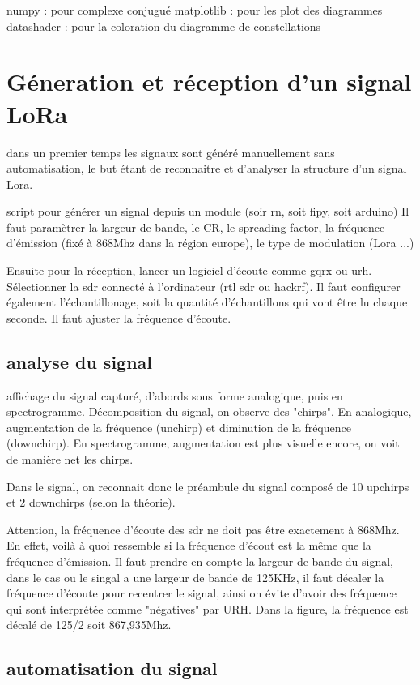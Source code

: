 numpy : pour complexe conjugué
matplotlib : pour les plot des diagrammes
datashader : pour la coloration du diagramme de constellations


\section{Géneration et réception d'un signal LoRa}

dans un premier temps les signaux sont généré manuellement sans automatisation, le but étant de reconnaitre et d'analyser la structure d'un signal Lora.

script pour générer un signal depuis un module (soir rn, soit fipy, soit arduino)
Il faut paramètrer la largeur de bande, le CR, le spreading factor, la fréquence d'émission (fixé à 868Mhz dans la région europe), le type de modulation (Lora ...)

Ensuite pour la réception, lancer un logiciel d'écoute comme gqrx ou urh. Sélectionner la sdr connecté à l'ordinateur (rtl sdr ou hackrf). Il faut configurer également l'échantillonage, soit la quantité d'échantillons qui vont être lu chaque seconde. Il faut ajuster la fréquence d'écoute.

\subsection{analyse du signal}

affichage du signal capturé, d'abords sous forme analogique, puis en spectrogramme.
Décomposition du signal, on observe des "chirps". En analogique, augmentation de la fréquence (unchirp) et diminution de la fréquence (downchirp). En spectrogramme, augmentation est plus visuelle encore, on voit de manière net les chirps.

Dans le signal, on reconnait donc le préambule du signal composé de 10 upchirps et 2 downchirps (selon la théorie).

Attention, la fréquence d'écoute des sdr ne doit pas être exactement à 868Mhz. En effet, voilà à quoi ressemble si la fréquence d'écout est la même que la fréquence d'émission. Il faut prendre en compte la largeur de bande du signal, dans le cas ou le singal a une largeur de bande de 125KHz, il faut décaler la fréquence d'écoute pour recentrer le signal, ainsi on évite d'avoir des fréquence qui sont interprétée comme "négatives" par URH. Dans la figure, la fréquence est décalé de 125/2 soit 867,935Mhz.

\subsection{automatisation du signal}

